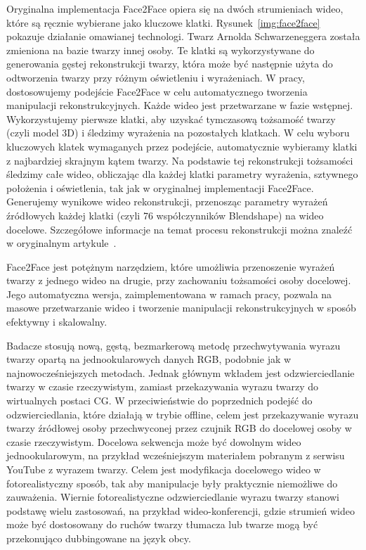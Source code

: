 Oryginalna implementacja Face2Face opiera się na dwóch strumieniach wideo, które są ręcznie wybierane jako kluczowe klatki.
Rysunek~\ref{img:face2face} pokazuje działanie omawianej technologi.
Twarz Arnolda Schwarzeneggera została zmieniona na bazie twarzy innej osoby.
Te klatki są wykorzystywane do generowania gęstej rekonstrukcji twarzy, która może być następnie użyta do odtworzenia twarzy przy różnym oświetleniu i wyrażeniach.
W pracy, dostosowujemy podejście Face2Face w celu automatycznego tworzenia manipulacji rekonstrukcyjnych.
Każde wideo jest przetwarzane w fazie wstępnej. Wykorzystujemy pierwsze klatki, aby uzyskać tymczasową tożsamość twarzy (czyli model 3D) i śledzimy wyrażenia na pozostałych klatkach. W celu wyboru kluczowych klatek wymaganych przez podejście, automatycznie wybieramy klatki z najbardziej skrajnym kątem twarzy. Na podstawie tej rekonstrukcji tożsamości śledzimy całe wideo, obliczając dla każdej klatki parametry wyrażenia, sztywnego położenia i oświetlenia, tak jak w oryginalnej implementacji Face2Face. Generujemy wynikowe wideo rekonstrukcji, przenosząc parametry wyrażeń źródłowych każdej klatki (czyli 76 współczynników Blendshape) na wideo docelowe. Szczegółowe informacje na temat procesu rekonstrukcji można znaleźć w oryginalnym artykule~\cite{thies2020face2face}.

Face2Face jest potężnym narzędziem, które umożliwia przenoszenie wyrażeń twarzy z jednego wideo na drugie, przy zachowaniu tożsamości osoby docelowej. Jego automatyczna wersja, zaimplementowana w ramach pracy, pozwala na masowe przetwarzanie wideo i tworzenie manipulacji rekonstrukcyjnych w sposób efektywny i skalowalny.

Badacze stosują nową, gęstą, bezmarkerową metodę przechwytywania wyrazu twarzy opartą na jednookularowych danych RGB, podobnie jak w najnowocześniejszych metodach. Jednak głównym wkładem jest odzwierciedlanie twarzy w czasie rzeczywistym, zamiast przekazywania wyrazu twarzy do wirtualnych postaci CG. W przeciwieństwie do poprzednich podejść do odzwierciedlania, które działają w trybie offline, celem jest przekazywanie wyrazu twarzy źródłowej osoby przechwyconej przez czujnik RGB do docelowej osoby w czasie rzeczywistym.
Docelowa sekwencja może być dowolnym wideo jednookularowym, na przykład wcześniejszym materiałem pobranym z serwisu YouTube z wyrazem twarzy. Celem jest modyfikacja docelowego wideo w fotorealistyczny sposób, tak aby manipulacje były praktycznie niemożliwe do zauważenia.
Wiernie fotorealistyczne odzwierciedlanie wyrazu twarzy stanowi podstawę wielu zastosowań, na przykład wideo-konferencji, gdzie strumień wideo może być dostosowany do ruchów twarzy tłumacza lub twarze mogą być przekonująco dubbingowane na język obcy.

